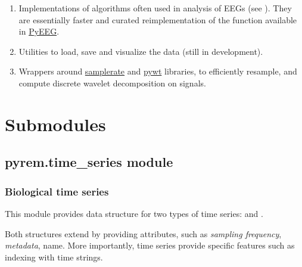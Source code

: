 \documentclass[letterpaper,10pt,english]{sphinxmanual}
\begin{document}
\begin{enumerate}
\begin{enumerate}
\end{enumerate}

\item {} 
Implementations of algorithms often used in analysis of EEGs (see {\hyperref[pyrem.univariate:module-pyrem.univariate]{}}). They are essentially  faster and curated reimplementation of the function available in \href{http://www.hindawi.com/journals/cin/2011/406391/}{PyEEG}.

\item {} 
Utilities to load, save and visualize the data (still in development).

\item {} 
Wrappers around \href{http://www.ar.media.kyoto-u.ac.jp/members/david/softwares/samplerate/sphinx/index.html}{samplerate} and \href{http://www.pybytes.com/pywavelets/}{pywt} libraries, to efficiently resample, and compute discrete wavelet decomposition on signals.

\end{enumerate}


\chapter{Submodules}
\label{index:pywt}\label{index:submodules}

\section{pyrem.time\_series module}
\label{pyrem.time_series:pyrem-time-series-module}\label{pyrem.time_series:module-pyrem.time_series}\label{pyrem.time_series::doc}

\subsection{Biological time series}
\label{pyrem.time_series:biological-time-series}
This module provides data structure for two types of time series: {\hyperref[pyrem.time_series:pyrem.time_series.Signal]{}} and {\hyperref[pyrem.time_series:pyrem.time_series.Annotation]{}}.

Both structures extend \href{http://docs.scipy.org/doc/numpy/reference/generated/numpy.ndarray.html\#numpy.ndarray}{} by providing attributes, such as \emph{sampling frequency}, \emph{metadata}, name.
More importantly, time series provide specific features such as indexing with time strings.
\end{document}
